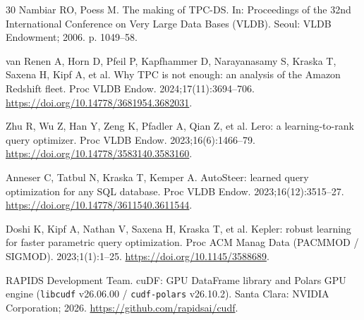 \documentclass[10pt,a4paper]{article}
\begin{document}
{\begin{thebibliography}{30}
Nambiar RO, Poess M. The making of TPC-DS. In: Proceedings of the 32nd International Conference on Very Large Data Bases (VLDB). Seoul: VLDB Endowment; 2006. p. 1049--58.

van Renen A, Horn D, Pfeil P, Kapfhammer D, Narayanasamy S, Kraska T, Saxena H, Kipf A, et al. Why TPC is not enough: an analysis of the Amazon Redshift fleet. Proc VLDB Endow. 2024;17(11):3694--706. \url{https://doi.org/10.14778/3681954.3682031}.

Zhu R, Wu Z, Han Y, Zeng K, Pfadler A, Qian Z, et al. Lero: a learning-to-rank query optimizer. Proc VLDB Endow. 2023;16(6):1466--79. \url{https://doi.org/10.14778/3583140.3583160}.

Anneser C, Tatbul N, Kraska T, Kemper A. AutoSteer: learned query optimization for any SQL database. Proc VLDB Endow. 2023;16(12):3515--27. \url{https://doi.org/10.14778/3611540.3611544}.

Doshi K, Kipf A, Nathan V, Saxena H, Kraska T, et al. Kepler: robust learning for faster parametric query optimization. Proc ACM Manag Data (PACMMOD / SIGMOD). 2023;1(1):1--25. \url{https://doi.org/10.1145/3588689}.


RAPIDS Development Team. cuDF: GPU DataFrame library and Polars GPU engine (\texttt{libcudf} v26.06.00 / \texttt{cudf-polars} v26.10.2). Santa Clara: NVIDIA Corporation; 2026. \url{https://github.com/rapidsai/cudf}.
\end{thebibliography}
}

\end{document}

